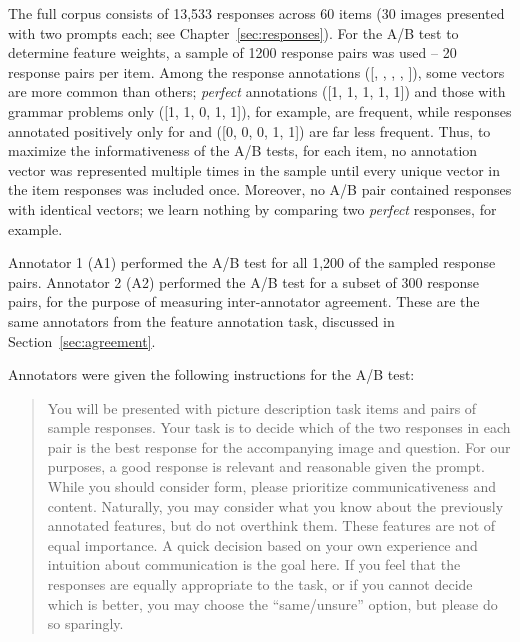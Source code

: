 The full corpus consists of 13,533 responses across 60 items (30 images presented with two prompts each; see Chapter~\ref{sec:responses}). For the A/B test to determine feature weights, a sample of 1200 response pairs was used -- 20 response pairs per item. Among the response annotations  ([, , , , ]), some vectors are more common than others; \textit{perfect} annotations ([1, 1, 1, 1, 1]) and those with grammar problems only ([1, 1, 0, 1, 1]), for example, are frequent, while responses annotated positively only for  and  ([0, 0, 0, 1, 1]) are far less frequent. Thus, to maximize the informativeness of the A/B tests, for each item, no annotation vector was represented multiple times in the sample until every unique vector in the item responses was included once. Moreover, no A/B pair contained responses with identical vectors; we learn nothing by comparing two \textit{perfect} responses, for example.

Annotator 1 (A1) performed the A/B test for all 1,200 of the sampled response pairs. Annotator 2 (A2) performed the A/B test for a subset of 300 response pairs, for the purpose of measuring inter-annotator agreement. These are the same annotators from the feature annotation task, discussed in Section~\ref{sec:agreement}. 

Annotators were given the following instructions for the A/B test:

\begin{quote}
You will be presented with picture description task items and pairs of sample responses. Your task is to decide which of the two responses in each pair is the best response for the accompanying image and question. For our purposes, a good response is relevant and reasonable given the prompt. While you should consider form, please prioritize communicativeness and content. Naturally, you may consider what you know about the previously annotated features, but do not overthink them. These features are not of equal importance. A quick decision based on your own experience and intuition about communication is the goal here. If you feel that the responses are equally appropriate to the task, or if you cannot decide which is better, you may choose the ``same/unsure'' option, but please do so sparingly.
\end{quote}

